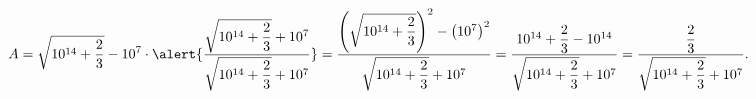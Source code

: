 \begin{frame}
\begin{solution}
\begin{enumerate}[a)]
			      \begin{equation*}
				      A=
				      \sqrt{10^{14}+\dfrac{2}{3}}-10^{7}\cdot
				      \alert{
				      \dfrac{
				      \sqrt{10^{14}+\dfrac{2}{3}}+10^{7}
				      }{
				      \sqrt{10^{14}+\dfrac{2}{3}}+10^{7}
				      }
				      }=
				      \dfrac{
				      \left(
				      \sqrt{10^{14}+\dfrac{2}{3}}
				      \right)^{2}
				      -{\left(
				      10^{7}
				      \right)}^{2}
				      }{
				      \sqrt{10^{14}+\dfrac{2}{3}}+10^{7}
				      }
				      =
				      \dfrac{
				      10^{14}+\dfrac{2}{3}-10^{14}
				      }{
				      \sqrt{10^{14}+\dfrac{2}{3}}+10^{7}
				      }=
				      \dfrac{\dfrac{2}{3}}{
				      \sqrt{10^{14}+\dfrac{2}{3}}+10^{7}
				      }.
			      \end{equation*}
		\end{enumerate}
	\end{solution}
\end{frame}
